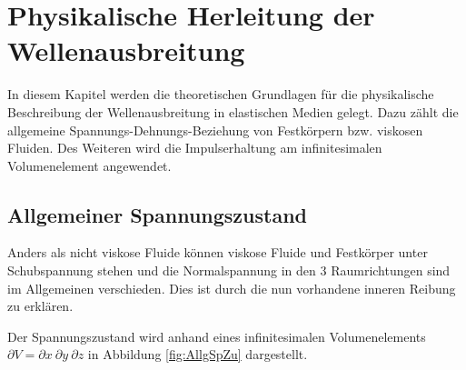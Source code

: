 \documentclass[pdftex,a4paper,parskip,listof=totoc,bibliography=totoc,onehalfspacing,12pt]{scrreprt}
\begin{document}
\newpage 
\thispagestyle{empty}
\quad 
\newpage

\setcounter{page}{1}

\chapter{Physikalische Herleitung der Wellenausbreitung}

In diesem Kapitel werden die theoretischen Grundlagen für die physikalische Beschreibung der Wellenausbreitung in elastischen Medien gelegt. Dazu zählt die allgemeine Spannungs-Dehnungs-Beziehung von Festkörpern bzw. viskosen Fluiden. Des Weiteren wird die Impulserhaltung am infinitesimalen Volumenelement angewendet.

\section{Allgemeiner Spannungszustand}
\label{kap:AllSp}
Anders als nicht viskose Fluide können viskose Fluide und Festkörper unter Schubspannung stehen und die Normalspannung in den 3 Raumrichtungen sind im Allgemeinen verschieden. Dies ist durch die nun vorhandene inneren Reibung zu erklären.

Der Spannungszustand wird anhand eines infinitesimalen Volumenelements $\partial V = \partial x~ \partial y~ \partial z$ in Abbildung \ref{fig:AllgSpZu} dargestellt.
\end{document}
